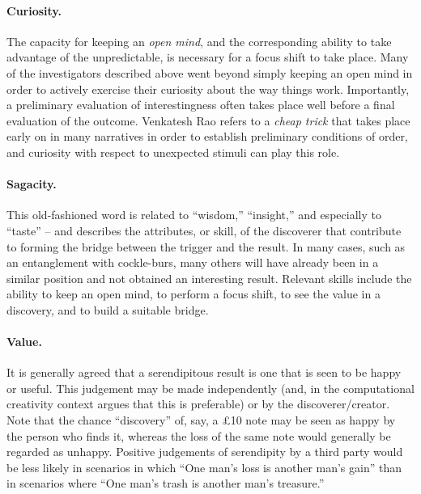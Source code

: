 \paragraph{Curiosity.}

The capacity for keeping an \emph{open mind}, and the corresponding
ability to take advantage of the unpredictable, is necessary for a
focus shift to take place.  Many of the investigators described above
went beyond simply keeping an open mind in order to actively exercise
their curiosity about the way things work.  Importantly, a preliminary
evaluation of interestingness often takes place well before a final
evaluation of the outcome.  Venkatesh Rao \citeyear{rao2011tempo} refers
to a \emph{cheap trick} that takes place early on in many narratives
in order to establish preliminary conditions of order, and curiosity
with respect to unexpected stimuli can play this role.

\paragraph{Sagacity.}

This old-fashioned word is related to ``wisdom,'' ``insight,'' and
especially to ``taste'' -- and describes the attributes, or skill, of
the discoverer that contribute to forming the bridge between the
trigger and the result.  In many cases, such as an entanglement with
cockle-burs, many others will have already been in a similar position
and not obtained an interesting result.  Relevant skills include the
ability to keep an open mind, to perform a focus shift, to see the
value in a discovery, and to build a suitable bridge.

\paragraph{Value.}

It is generally agreed that a serendipitous result is one that is seen
to be happy or useful.
%
This judgement may be made independently (and, in the computational
creativity context \cite{jordanous:12} argues that this is
preferable) or by the discoverer/creator.  Note that the chance
``discovery'' of, say, a \pounds 10 note may be seen as happy by the
person who finds it, whereas the loss of the same note would generally
be regarded as unhappy.  Positive judgements of serendipity by a third
party would be less likely in scenarios in which ``One man's loss is
another man's gain'' than in scenarios where ``One man's trash is
another man's treasure.''

